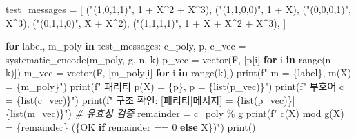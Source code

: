 \documentclass[
  oneside]{article}
\newenvironment{Shaded}{}{}
\newcommand{\BuiltInTok}[1]{\textcolor[rgb]{0.00,0.50,0.00}{#1}}
\newcommand{\CommentTok}[1]{\textcolor[rgb]{0.38,0.63,0.69}{\textit{#1}}}
\newcommand{\ControlFlowTok}[1]{\textcolor[rgb]{0.00,0.44,0.13}{\textbf{#1}}}
\newcommand{\DecValTok}[1]{\textcolor[rgb]{0.25,0.63,0.44}{#1}}
\newcommand{\KeywordTok}[1]{\textcolor[rgb]{0.00,0.44,0.13}{\textbf{#1}}}
\newcommand{\NormalTok}[1]{#1}
\newcommand{\OperatorTok}[1]{\textcolor[rgb]{0.40,0.40,0.40}{#1}}
\newcommand{\SpecialCharTok}[1]{\textcolor[rgb]{0.25,0.44,0.63}{#1}}
\newcommand{\SpecialStringTok}[1]{\textcolor[rgb]{0.73,0.40,0.53}{#1}}
\newcommand{\StringTok}[1]{\textcolor[rgb]{0.25,0.44,0.63}{#1}}
\begin{document}
\begin{Shaded}
\begin{Highlighting}[]
\NormalTok{test\_messages }\OperatorTok{=}\NormalTok{ [}
\NormalTok{    (}\StringTok{"(1,0,1,1)"}\NormalTok{, }\DecValTok{1} \OperatorTok{+}\NormalTok{ X}\OperatorTok{\^{}}\DecValTok{2} \OperatorTok{+}\NormalTok{ X}\OperatorTok{\^{}}\DecValTok{3}\NormalTok{),}
\NormalTok{    (}\StringTok{"(1,1,0,0)"}\NormalTok{, }\DecValTok{1} \OperatorTok{+}\NormalTok{ X),}
\NormalTok{    (}\StringTok{"(0,0,0,1)"}\NormalTok{, X}\OperatorTok{\^{}}\DecValTok{3}\NormalTok{),}
\NormalTok{    (}\StringTok{"(0,1,1,0)"}\NormalTok{, X }\OperatorTok{+}\NormalTok{ X}\OperatorTok{\^{}}\DecValTok{2}\NormalTok{),}
\NormalTok{    (}\StringTok{"(1,1,1,1)"}\NormalTok{, }\DecValTok{1} \OperatorTok{+}\NormalTok{ X }\OperatorTok{+}\NormalTok{ X}\OperatorTok{\^{}}\DecValTok{2} \OperatorTok{+}\NormalTok{ X}\OperatorTok{\^{}}\DecValTok{3}\NormalTok{),}
\NormalTok{]}

\ControlFlowTok{for}\NormalTok{ label, m\_poly }\KeywordTok{in}\NormalTok{ test\_messages:}
\NormalTok{    c\_poly, p, c\_vec }\OperatorTok{=}\NormalTok{ systematic\_encode(m\_poly, g, n, k)}
\NormalTok{    p\_vec }\OperatorTok{=}\NormalTok{ vector(F, [p[i] }\ControlFlowTok{for}\NormalTok{ i }\KeywordTok{in} \BuiltInTok{range}\NormalTok{(n }\OperatorTok{{-}}\NormalTok{ k)])}
\NormalTok{    m\_vec }\OperatorTok{=}\NormalTok{ vector(F, [m\_poly[i] }\ControlFlowTok{for}\NormalTok{ i }\KeywordTok{in} \BuiltInTok{range}\NormalTok{(k)])}
    \BuiltInTok{print}\NormalTok{(}\SpecialStringTok{f"  m = }\SpecialCharTok{\{}\NormalTok{label}\SpecialCharTok{\}}\SpecialStringTok{,  m(X) = }\SpecialCharTok{\{}\NormalTok{m\_poly}\SpecialCharTok{\}}\SpecialStringTok{"}\NormalTok{)}
    \BuiltInTok{print}\NormalTok{(}\SpecialStringTok{f"  패리티 p(X) = }\SpecialCharTok{\{}\NormalTok{p}\SpecialCharTok{\}}\SpecialStringTok{,  p = }\SpecialCharTok{\{}\BuiltInTok{list}\NormalTok{(p\_vec)}\SpecialCharTok{\}}\SpecialStringTok{"}\NormalTok{)}
    \BuiltInTok{print}\NormalTok{(}\SpecialStringTok{f"  부호어 c = }\SpecialCharTok{\{}\BuiltInTok{list}\NormalTok{(c\_vec)}\SpecialCharTok{\}}\SpecialStringTok{"}\NormalTok{)}
    \BuiltInTok{print}\NormalTok{(}\SpecialStringTok{f"  구조 확인: [패리티|메시지] = }\SpecialCharTok{\{}\BuiltInTok{list}\NormalTok{(p\_vec)}\SpecialCharTok{\}}\SpecialStringTok{|}\SpecialCharTok{\{}\BuiltInTok{list}\NormalTok{(m\_vec)}\SpecialCharTok{\}}\SpecialStringTok{"}\NormalTok{)}
    \CommentTok{\# 유효성 검증}
\NormalTok{    remainder }\OperatorTok{=}\NormalTok{ c\_poly }\OperatorTok{\%}\NormalTok{ g}
    \BuiltInTok{print}\NormalTok{(}\SpecialStringTok{f"  c(X) mod g(X) = }\SpecialCharTok{\{}\NormalTok{remainder}\SpecialCharTok{\}}\SpecialStringTok{  (}\SpecialCharTok{\{}\StringTok{\textquotesingle{}OK\textquotesingle{}} \ControlFlowTok{if}\NormalTok{ remainder }\OperatorTok{==} \DecValTok{0} \ControlFlowTok{else} \StringTok{\textquotesingle{}X\textquotesingle{}}\SpecialCharTok{\}}\SpecialStringTok{)"}\NormalTok{)}
    \BuiltInTok{print}\NormalTok{()}


\end{Highlighting}
\end{Shaded}
\end{document}
